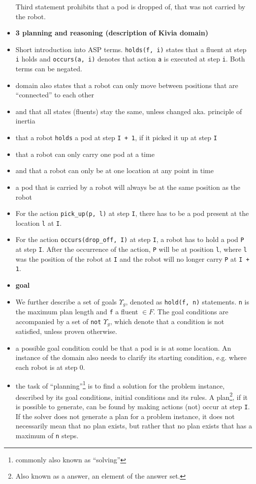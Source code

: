 \documentclass[runningheads]{llncs}
\begin{document}
\begin{itemize}
    Third statement prohibits that a pod is dropped of, that was not carried by the robot. 
    \item \textbf{3 planning and reasoning (description of Kivia domain)}
    \item Short introduction into ASP terms. \verb|holds(f, i)| states that a fluent at step \verb|i| holds and \verb|occurs(a, i)| denotes that action \verb|a| is executed at step \verb|i|. Both terms can be negated. 
    \item domain also states that a robot can only move between positions that are ``connected'' to each other
    \item and that all states (fluents) stay the same, unless changed aka. principle of inertia
    \item that a robot \verb|holds| a pod at step  \verb|I + 1|, if it picked it up at step \verb|I|
    \item that a robot can only carry one pod at a time
    \item and that a robot can only be at one location at any point in time
    \item a pod that is carried by a robot will always be at the same position as the robot
    \item For the action \verb|pick_up(p, l)| at step  \verb|I|, there has to be a pod present at the location \verb|l| at \verb|I|.
    \item For the action \verb|occurs(drop_off, I)| at step \verb|I|, a robot has to hold a pod \verb|P| at step \verb|I|. After the occurrence of the action, \verb|P| will be at position \verb|l|, where \verb|l| was the position of the robot at \verb|I| and the robot will no longer carry \verb|P| at \verb|I + 1|.
    \item \textbf{goal}
    \item We further describe a set of goals $\Upsilon_g$, denoted as \verb|hold(f, n)| statements. \verb|n| is the maximum plan length and \verb|f| a fluent $\in F$. The goal conditions are accompanied by a set of \verb|not| $\Upsilon_g$, which denote that a condition is not satisfied, unless proven otherwise.
    \item a possible goal condition could be that a pod is is at some location. 
    \itme An instance of the domain also needs to clarify its starting condition, e.g. where each robot is at step 0. 
    \item the task of ``planning''\footnote{commonly also known as ``solving''} is to find a solution for the problem instance, described by its goal conditions, initial conditions and its rules. A plan\footnote{Also known as a answer, an element of the answer set.}, if it is possible to generate, can be found by making actions (not) occur at step \verb|I|. If the solver does not generate a plan for a problem instance, it does not necessarily mean that no plan exists, but rather that no plan exists that has a maximum of \verb|n| steps. 

\end{itemize}
\end{document}
